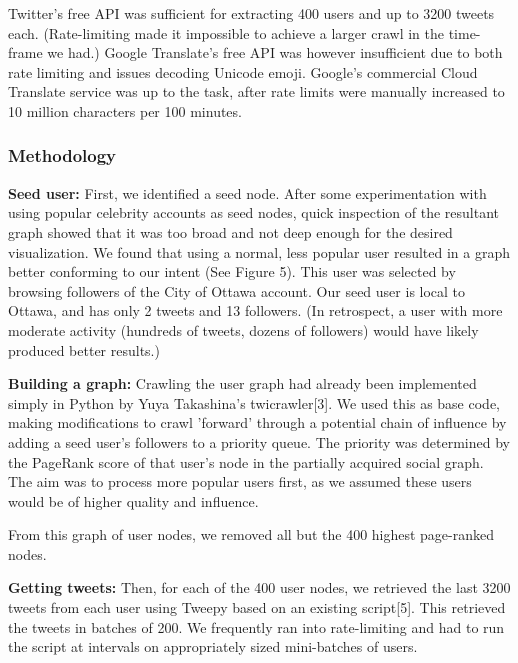 \documentclass[11pt]{article}
\begin{document}
Twitter's free API was sufficient for extracting 400 users and up to 3200 tweets each. (Rate-limiting made it impossible to achieve a larger crawl in the time-frame we had.) Google Translate's free API was however insufficient due to both rate limiting and issues decoding Unicode emoji. Google's commercial Cloud Translate service was up to the task, after rate limits were manually increased to 10 million characters per 100 minutes.\newline

\subsubsection{Methodology}

\textbf{Seed user:} First, we identified a seed node. After some experimentation with using popular celebrity accounts as seed nodes, quick inspection of the resultant graph showed that it was too broad and not deep enough for the desired visualization. We found that using a normal, less popular user resulted in a graph better conforming to our intent (See Figure 5). This user was selected by browsing followers of the City of Ottawa account. Our seed user is local to Ottawa, and has only 2 tweets and 13 followers. (In retrospect, a user with more moderate activity (hundreds of tweets, dozens of followers) would have likely produced better results.)\newline

\textbf{Building a graph:} Crawling the user graph had already been implemented simply in Python by Yuya Takashina's twicrawler[3]. We used this as base code, making modifications to crawl 'forward' through a potential chain of influence by adding a seed user's followers to a priority queue. The priority was determined by the PageRank score of that user's node in the partially acquired social graph. The aim was to process more popular users first, as we assumed these users would be of higher quality and influence.

From this graph of user nodes, we removed all but the 400 highest page-ranked nodes.\newline

\textbf{Getting tweets:} Then, for each of the 400 user nodes, we retrieved the last 3200 tweets from each user using Tweepy based on an existing script[5]. This retrieved the tweets in batches of 200. We frequently ran into rate-limiting and had to run the script at intervals on appropriately sized mini-batches of users.\newline
\end{document}

